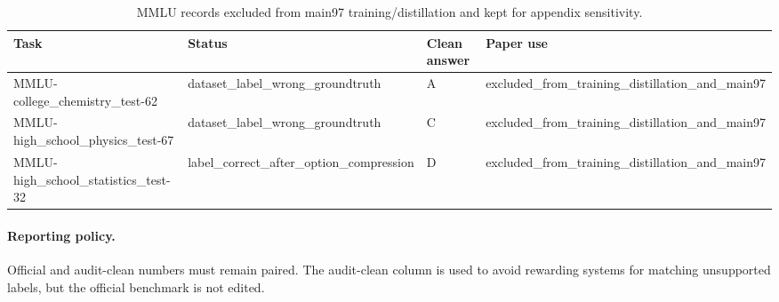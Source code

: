 \begin{table}[h]
\centering
\small
\begin{tabular}{llll}
\toprule
Task & Status & Clean answer & Paper use \\
\midrule
MMLU-college\_chemistry\_test-62 & dataset\_label\_wrong\_groundtruth & A & excluded\_from\_training\_distillation\_and\_main97 \\
MMLU-high\_school\_physics\_test-67 & dataset\_label\_wrong\_groundtruth & C & excluded\_from\_training\_distillation\_and\_main97 \\
MMLU-high\_school\_statistics\_test-32 & label\_correct\_after\_option\_compression & D & excluded\_from\_training\_distillation\_and\_main97 \\
\bottomrule
\end{tabular}
\caption{MMLU records excluded from main97 training/distillation and kept for appendix sensitivity.}
\label{tab:mmlu-label-audit}
\end{table}

\paragraph{Reporting policy.}
Official and audit-clean numbers must remain paired. The audit-clean column is used to avoid rewarding systems for matching unsupported labels, but the official benchmark is not edited.
